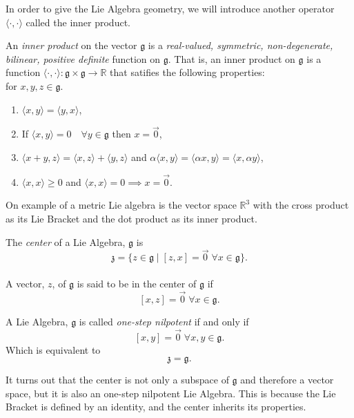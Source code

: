 \documentclass[11 pt]{article}
\renewcommand{\a}{\alpha}
\newcommand{\fg}{\mathfrak{g}}
\newcommand{\fz}{\mathfrak{z}}
\newcommand{\RR}{\mathbb{R}}
\begin{document}
    In order to give the Lie Algebra geometry, we will introduce another
    operator $\langle\cdot,\cdot\rangle$ called the inner product.
\begin{definition}
    An \emph{inner product} on the vector $\fg$ is a
    \emph{real-valued, symmetric, non-degenerate, bilinear, positive definite}
    function on $\fg$.  That is, an inner product on $\fg$ is a function
    $\langle\cdot,\cdot\rangle:\fg\times\fg\to\RR$ that satifies the following
    properties:
    \\for $x,y,z \in \fg$.
    \begin{enumerate}
        \item $\langle x,y \rangle = \langle y,x \rangle$,
        \item If $\langle x,y \rangle = 0 \quad \forall y \in \fg$
            then $x = \Vec{0}$,
        \item
            $\langle x+y,z \rangle = \langle x,z \rangle + \langle y,z \rangle$
            and $\a \langle x,y \rangle = \langle \a x,y \rangle
            = \langle x,\a y \rangle$,
        \item $\langle x,x \rangle \geq 0$
            and $\langle x,x\rangle = 0 \implies x=\Vec{0}$.
    \end{enumerate}
\end{definition}
    On example of a metric Lie algebra is the vector space $\RR^3$ with the
    cross product as its Lie Bracket and the dot product as its inner product.

\begin{definition}
    The \emph{center} of a Lie Algebra, $\fg$ is
    \\\[\fz=\{z \in \fg \mid [z,x]
    = \Vec{0} \; \forall x \in \fg\}.\]
    \\A vector, $z$, of $\fg$ is said to be in the center of $\fg$ if
    \\\[[x,z] = \Vec{0} \; \forall x \in \fg.\]
\end{definition}

\begin{definition}
    A Lie Algebra, $\fg$ is called \emph{one-step nilpotent} if and only if
    \[[x,y] = \Vec{0} \; \forall x,y \in \fg. \]
    Which is equivalent to \[\fz = \fg.\]
\end{definition}

It turns out that the center is not only a subspace of $\fg$ and therefore a
vector space, but it is also an one-step nilpotent Lie Algebra.  This is
because the Lie Bracket is defined by an identity, and the center inherits its
properties.
\end{document}
